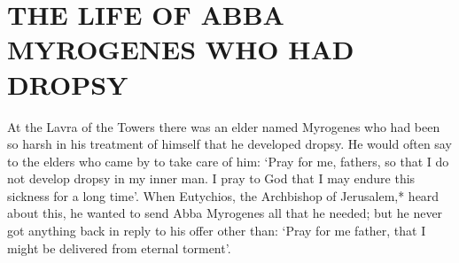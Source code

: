 \chapter{THE LIFE OF ABBA MYROGENES WHO HAD DROPSY}

At the Lavra of the Towers there was an elder named Myrogenes who had been so harsh in his treatment of himself that he developed dropsy.
He would often say to the elders who came by to take care of him: `Pray for me, fathers, so that I do not develop dropsy in my inner man.
I pray to God that I may endure this sickness for a long time'.
When Eutychios, the Archbishop of Jerusalem,* heard about this, he wanted to send Abba Myrogenes all that he needed;
but he never got anything back in reply to his offer other than:
`Pray for me father, that I might be delivered from eternal torment'.

